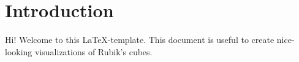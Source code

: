 \section{Introduction}

Hi! 
Welcome to this \LaTeX-template.
This document is useful to create nice-looking visualizations of Rubik's cubes.


\nocite{tronto_2019}  %